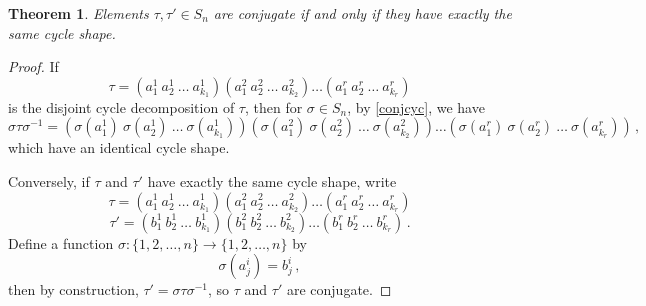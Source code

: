 \documentclass{article}
\theoremstyle{plain}\theoremheaderfont{\normalfont\itshape}\theorembodyfont{\rmfamily}\theoremseparator{.}\newtheorem*{rem}{Remark}\newtheorem*{ex}{Example}\newtheorem*{proof}{Proof}\newtheorem*{altp}{Alternative proof}
\theoremstyle{plain}\theoremheaderfont{\normalfont\bfseries}\theorembodyfont{\rmfamily}\theoremseparator{.}\newtheorem{thm}{Theorem}[section]\newtheorem{lem}[thm]{Lemma}\newtheorem{prop}[thm]{Proposition}\newtheorem*{cor}{Corollary}\newtheorem{defn}[thm]{Definition}\newtheorem{clm}[thm]{Claim}\newtheorem{clminproof}{Claim}
\theoremstyle{break}\theoremheaderfont{\normalfont\itshape}\theorembodyfont{\rmfamily}\theoremseparator{.\medskip}\newtheorem*{proofskip}{Proof}\newtheorem*{exs}{Examples}\newtheorem*{rems}{Remarks}
\theoremstyle{break}\theoremheaderfont{\normalfont\bfseries}\theorembodyfont{\rmfamily}\theoremseparator{.\medskip}\newtheorem{lemskip}[thm]{Lemma}\newtheorem{defnskip}[thm]{Definition}\newtheorem{propskip}[thm]{Proposition}\newtheorem{thmskip}[thm]{Theorem}
\numberwithin{equation}{section}
\begin{document}
	\begin{thm}
		Elements \(\tau,\tau'\in S_n\) are conjugate if and only if they have exactly the same cycle shape.
	\end{thm}
	\begin{proof}
		If
		\[\tau=(a_1^1~a_2^1~\dots~a_{k_1}^{1})(a_1^2~a_2^2~\dots~a_{k_2}^{2})\dots(a_1^r~a_2^r~\dots~a_{k_r}^{r})\]
		is the disjoint cycle decomposition of \(\tau\), then for \(\sigma\in S_n\), by \cref{conjcyc}, we have
		\[\sigma\tau\sigma^{-1}=(\sigma(a_1^1)~\sigma(a_2^1)~\dots~\sigma(a_{k_1}^1))(\sigma(a_1^2)~\sigma(a_2^2)~\dots~\sigma(a_{k_2}^2))\dots(\sigma(a_1^r)~\sigma(a_2^r)~\dots~\sigma(a_{k_r}^r))\,,\]
		which have an identical cycle shape.

		Conversely, if \(\tau\) and \(\tau'\) have exactly the same cycle shape, write
		\[\tau=(a_1^1~a_2^1~\dots~a_{k_1}^{1})(a_1^2~a_2^2~\dots~a_{k_2}^{2})\dots(a_1^r~a_2^r~\dots~a_{k_r}^{r})\]
		\[\tau'=(b_1^1~b_2^1~\dots~b_{k_1}^{1})(b_1^2~b_2^2~\dots~b_{k_2}^{2})\dots(b_1^r~b_2^r~\dots~b_{k_r}^{r})\,.\]
		Define a function \(\sigma:\{1,2,\dots,n\}\to\{1,2,\dots,n\}\) by
		\[\sigma(a^i_j)=b^i_j\,,\]
		then by construction, \(\tau'=\sigma\tau\sigma^{-1}\), so \(\tau\) and \(\tau'\) are conjugate.
	\end{proof}
\end{document}
